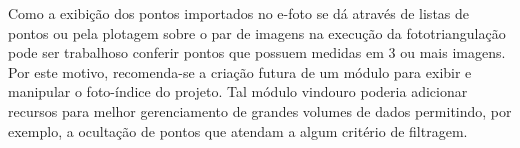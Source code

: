 Como a exibição dos pontos importados no e-foto se dá através de listas de pontos ou pela plotagem sobre o par de imagens na execução da fototriangulação pode ser trabalhoso conferir pontos que possuem medidas em 3 ou mais imagens. Por este motivo, recomenda-se a criação futura de um módulo para exibir e manipular o foto-índice do projeto. Tal módulo vindouro poderia adicionar recursos para melhor gerenciamento de grandes volumes de dados permitindo, por exemplo, a ocultação de pontos que atendam a algum critério de filtragem.
